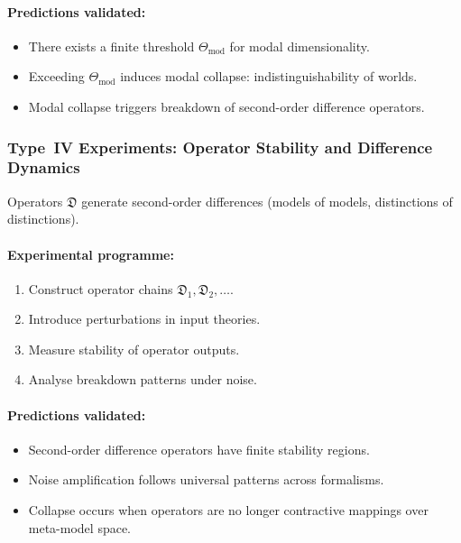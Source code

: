 \paragraph{Predictions validated:}

\begin{itemize}
    \item There exists a finite threshold $\Theta_{\mathrm{mod}}$ for 
          modal dimensionality.
    \item Exceeding $\Theta_{\mathrm{mod}}$ induces modal collapse:
          indistinguishability of worlds.
    \item Modal collapse triggers breakdown of 
          second-order difference operators.
\end{itemize}



\subsubsection{Type~IV Experiments: Operator Stability and Difference Dynamics}

Operators $\mathfrak{D}$ generate second-order differences 
(models of models, distinctions of distinctions).

\paragraph{Experimental programme:}

\begin{enumerate}
    \item Construct operator chains $\mathfrak{D}_1, \mathfrak{D}_2, \dots$.
    \item Introduce perturbations in input theories.
    \item Measure stability of operator outputs.
    \item Analyse breakdown patterns under noise.
\end{enumerate}

\paragraph{Predictions validated:}

\begin{itemize}
    \item Second-order difference operators have finite stability regions.
    \item Noise amplification follows universal patterns across formalisms.
    \item Collapse occurs when operators are no longer 
          contractive mappings over meta-model space.
\end{itemize}



